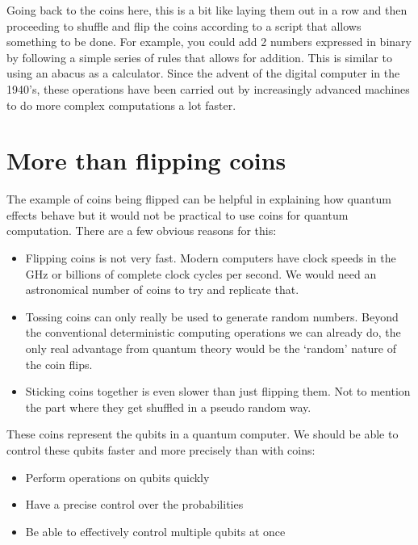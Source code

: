 \documentclass{book}
\begin{document}
Going back to the coins here, this is a bit like laying them out in a row and then proceeding to shuffle and flip the coins according to a script that allows something to be done. For example, you could add 2 numbers expressed in binary by following a simple series of rules that allows for addition. This is similar to using an abacus as a calculator. Since the advent of the digital computer in the 1940's, these operations have been carried out by increasingly advanced machines to do more complex computations a lot faster.

\section{More than flipping coins} 

The example of coins being flipped can be helpful in explaining how quantum effects behave but it would not be practical to use coins for quantum computation. There are a few obvious reasons for this: 

\begin{itemize}
    \item Flipping coins is not very fast. Modern computers have clock speeds in the GHz or billions of complete clock cycles per second. We would need an astronomical number of coins to try and replicate that. 
    
    \item Tossing coins can only really be used to generate random numbers. Beyond the conventional deterministic computing operations we can already do, the only real advantage from quantum theory would be the `random' nature of the coin flips. 
    
    \item Sticking coins together is even slower than just flipping them. Not to mention the part where they get shuffled in a pseudo random way. 
\end{itemize}



These coins represent the qubits in a quantum computer. We should be able to control these qubits faster and more precisely than with coins:
\begin{itemize}
\item Perform operations on qubits quickly 
\item Have a precise control over the probabilities 
\item Be able to effectively control multiple qubits at once 
\end{itemize}
\end{document}
